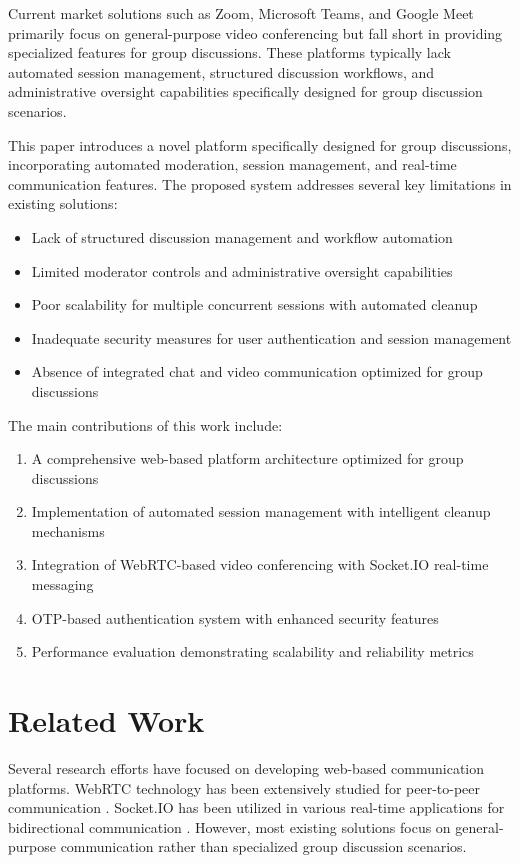 \documentclass[conference]{IEEEtran}
\begin{document}
Current market solutions such as Zoom, Microsoft Teams, and Google Meet primarily focus on general-purpose video conferencing but fall short in providing specialized features for group discussions. These platforms typically lack automated session management, structured discussion workflows, and administrative oversight capabilities specifically designed for group discussion scenarios.

This paper introduces a novel platform specifically designed for group discussions, incorporating automated moderation, session management, and real-time communication features. The proposed system addresses several key limitations in existing solutions:

\begin{itemize}
\item Lack of structured discussion management and workflow automation
\item Limited moderator controls and administrative oversight capabilities
\item Poor scalability for multiple concurrent sessions with automated cleanup
\item Inadequate security measures for user authentication and session management
\item Absence of integrated chat and video communication optimized for group discussions
\end{itemize}

The main contributions of this work include:
\begin{enumerate}
\item A comprehensive web-based platform architecture optimized for group discussions
\item Implementation of automated session management with intelligent cleanup mechanisms
\item Integration of WebRTC-based video conferencing with Socket.IO real-time messaging
\item OTP-based authentication system with enhanced security features
\item Performance evaluation demonstrating scalability and reliability metrics
\end{enumerate}

\section{Related Work}

Several research efforts have focused on developing web-based communication platforms. WebRTC technology has been extensively studied for peer-to-peer communication \cite{webrtc_samples}. Socket.IO has been utilized in various real-time applications for bidirectional communication \cite{socketio_docs}. However, most existing solutions focus on general-purpose communication rather than specialized group discussion scenarios.
\end{document}

